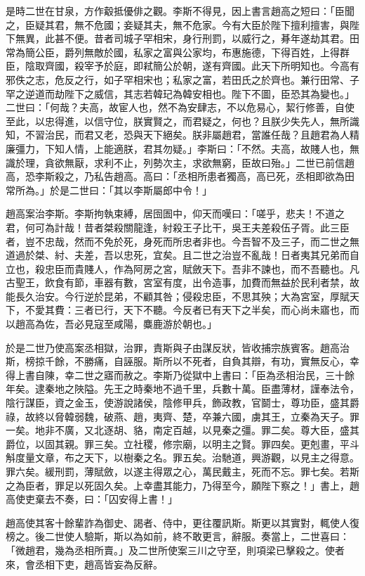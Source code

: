 \begin{pinyinscope}
是時二世在甘泉，方作觳抵優俳之觀。李斯不得見，因上書言趙高之短曰：「臣聞之，臣疑其君，無不危國；妾疑其夫，無不危家。今有大臣於陛下擅利擅害，與陛下無異，此甚不便。昔者司城子罕相宋，身行刑罰，以威行之，朞年遂劫其君。田常為簡公臣，爵列無敵於國，私家之富與公家均，布惠施德，下得百姓，上得群臣，陰取齊國，殺宰予於庭，即弒簡公於朝，遂有齊國。此天下所明知也。今高有邪佚之志，危反之行，如子罕相宋也；私家之富，若田氏之於齊也。兼行田常、子罕之逆道而劫陛下之威信，其志若韓玘為韓安相也。陛下不圖，臣恐其為變也。」二世曰：「何哉？夫高，故宦人也，然不為安肆志，不以危易心，絜行修善，自使至此，以忠得進，以信守位，朕實賢之，而君疑之，何也？且朕少失先人，無所識知，不習治民，而君又老，恐與天下絕矣。朕非屬趙君，當誰任哉？且趙君為人精廉彊力，下知人情，上能適朕，君其勿疑。」李斯曰：「不然。夫高，故賤人也，無識於理，貪欲無厭，求利不止，列勢次主，求欲無窮，臣故曰殆。」二世已前信趙高，恐李斯殺之，乃私告趙高。高曰：「丞相所患者獨高，高已死，丞相即欲為田常所為。」於是二世曰：「其以李斯屬郎中令！」

趙高案治李斯。李斯拘執束縛，居囹圄中，仰天而嘆曰：「嗟乎，悲夫！不道之君，何可為計哉！昔者桀殺關龍逢，紂殺王子比干，吳王夫差殺伍子胥。此三臣者，豈不忠哉，然而不免於死，身死而所忠者非也。今吾智不及三子，而二世之無道過於桀、紂、夫差，吾以忠死，宜矣。且二世之治豈不亂哉！日者夷其兄弟而自立也，殺忠臣而貴賤人，作為阿房之宮，賦斂天下。吾非不諫也，而不吾聽也。凡古聖王，飲食有節，車器有數，宮室有度，出令造事，加費而無益於民利者禁，故能長久治安。今行逆於昆弟，不顧其咎；侵殺忠臣，不思其殃；大為宮室，厚賦天下，不愛其費：三者已行，天下不聽。今反者已有天下之半矣，而心尚未寤也，而以趙高為佐，吾必見寇至咸陽，麋鹿游於朝也。」

於是二世乃使高案丞相獄，治罪，責斯與子由謀反狀，皆收捕宗族賓客。趙高治斯，榜掠千餘，不勝痛，自誣服。斯所以不死者，自負其辯，有功，實無反心，幸得上書自陳，幸二世之寤而赦之。李斯乃從獄中上書曰：「臣為丞相治民，三十餘年矣。逮秦地之陜隘。先王之時秦地不過千里，兵數十萬。臣盡薄材，謹奉法令，陰行謀臣，資之金玉，使游說諸侯，陰修甲兵，飾政教，官鬬士，尊功臣，盛其爵祿，故終以脅韓弱魏，破燕、趙，夷齊、楚，卒兼六國，虜其王，立秦為天子。罪一矣。地非不廣，又北逐胡、貉，南定百越，以見秦之彊。罪二矣。尊大臣，盛其爵位，以固其親。罪三矣。立社稷，修宗廟，以明主之賢。罪四矣。更剋畫，平斗斛度量文章，布之天下，以樹秦之名。罪五矣。治馳道，興游觀，以見主之得意。罪六矣。緩刑罰，薄賦斂，以遂主得眾之心，萬民戴主，死而不忘。罪七矣。若斯之為臣者，罪足以死固久矣。上幸盡其能力，乃得至今，願陛下察之！」書上，趙高使吏棄去不奏，曰：「囚安得上書！」

趙高使其客十餘輩詐為御史、謁者、侍中，更往覆訊斯。斯更以其實對，輒使人復榜之。後二世使人驗斯，斯以為如前，終不敢更言，辭服。奏當上，二世喜曰：「微趙君，幾為丞相所賣。」及二世所使案三川之守至，則項梁已擊殺之。使者來，會丞相下吏，趙高皆妄為反辭。


\end{pinyinscope}
